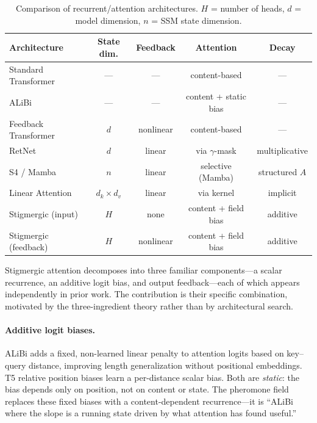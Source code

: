 \documentclass[11pt,a4paper]{article}
\begin{document}
\begin{table}[h]
\centering
\begin{tabular}{@{}lcccc@{}}
\toprule
\textbf{Architecture} & \textbf{State dim.} & \textbf{Feedback} &
\textbf{Attention} & \textbf{Decay} \\
\midrule
Standard Transformer & --- & --- & content-based & --- \\
ALiBi               & --- & --- & content + static bias & --- \\
Feedback Transformer & $d$ & nonlinear & content-based & --- \\
RetNet              & $d$ & linear & via $\gamma$-mask & multiplicative \\
S4 / Mamba          & $n$ & linear & selective (Mamba) & structured $A$ \\
Linear Attention    & $d_k \times d_v$ & linear & via kernel & implicit \\
\addlinespace
Stigmergic (input)  & $H$ & none & content + field bias & additive \\
Stigmergic (feedback) & $H$ & nonlinear & content + field bias & additive \\
\bottomrule
\end{tabular}
\caption{Comparison of recurrent/attention architectures. $H$ = number
of heads, $d$ = model dimension, $n$ = SSM state dimension.}
\label{tab:architectures}
\end{table}

Stigmergic attention decomposes into three familiar components---a
scalar recurrence, an additive logit bias, and output feedback---each
of which appears independently in prior work.  The contribution is
their specific combination, motivated by the three-ingredient theory
rather than by architectural search.

\paragraph{Additive logit biases.}
ALiBi \cite{press2022alibi} adds a fixed, non-learned linear penalty
to attention logits based on key--query distance, improving length
generalization without positional embeddings.  T5 relative position
biases \cite{raffel2020t5} learn a per-distance scalar bias.  Both
are \emph{static}: the bias depends only on position, not on content
or state.  The pheromone field replaces these fixed biases with a
content-dependent recurrence---it is ``ALiBi where the slope is a
running state driven by what attention has found useful.''
\end{document}

